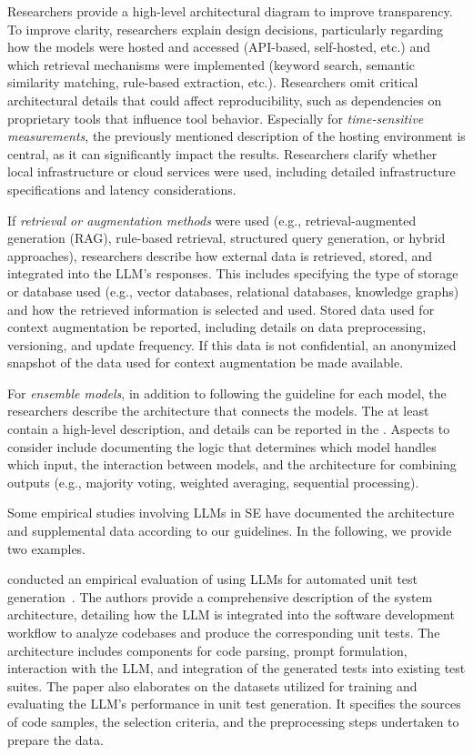 Researchers \should provide a high-level architectural diagram to improve transparency.
To improve clarity, researchers \should explain design decisions, particularly regarding how the models were hosted and accessed (API-based, self-hosted, etc.) and which retrieval mechanisms were implemented (keyword search, semantic similarity matching, rule-based extraction, etc.).
Researchers \mustnot omit critical architectural details that could affect reproducibility, such as dependencies on proprietary tools that influence tool behavior. 
Especially for \emph{time-sensitive measurements}, the previously mentioned description of the hosting environment is central, as it can significantly impact the results.
Researchers \must clarify whether local infrastructure or cloud services were used, including detailed infrastructure specifications and latency considerations.

If \emph{retrieval or augmentation methods} were used (e.g., retrieval-augmented generation (RAG), rule-based retrieval, structured query generation, or hybrid approaches), researchers \must describe how external data is retrieved, stored, and integrated into the LLM's responses.
This includes specifying the type of storage or database used (e.g., vector databases, relational databases, knowledge graphs) and how the retrieved information is selected and used.
Stored data used for context augmentation \must be reported, including details on data preprocessing, versioning, and update frequency.
If this data is not confidential, an anonymized snapshot of the data used for context augmentation \should be made available.

For \emph{ensemble models}, in addition to following the \modelversion guideline for each model, the researchers \must describe the architecture that connects the models.
The \paper \must at least contain a high-level description, and details can be reported in the \supplementarymaterial.
Aspects to consider include documenting the logic that determines which model handles which input, the interaction between models, and the architecture for combining outputs (e.g., majority voting, weighted averaging, sequential processing).


Some empirical studies involving LLMs in SE have documented the architecture and supplemental data according to our guidelines. In the following, we provide two examples.

\citeauthor{DBLP:journals/tse/SchaferNET24} conducted an empirical evaluation of using LLMs for automated unit test generation~\cite{DBLP:journals/tse/SchaferNET24}.
The authors provide a comprehensive description of the system architecture, detailing how the LLM is integrated into the software development workflow to analyze codebases and produce the corresponding unit tests.
The architecture includes components for code parsing, prompt formulation, interaction with the LLM, and integration of the generated tests into existing test suites.
The paper also elaborates on the datasets utilized for training and evaluating the LLM's performance in unit test generation.
It specifies the sources of code samples, the selection criteria, and the preprocessing steps undertaken to prepare the data.

